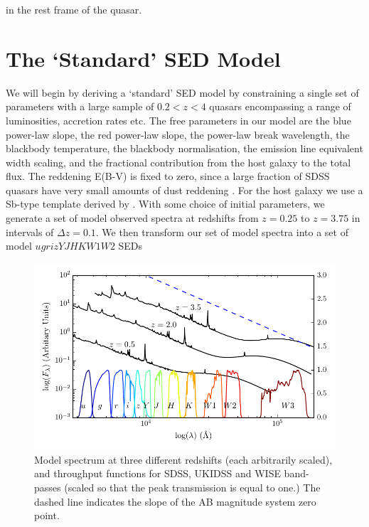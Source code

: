 in the rest frame of the quasar. 

\section{The `Standard' SED Model} 

We will begin by deriving a `standard' SED model by constraining a single set of parameters with a large sample of $0.2 < z < 4$ quasars encompassing a range of luminosities, accretion rates etc. 
The free parameters in our model are the blue power-law slope, the red power-law slope, the power-law break wavelength, the blackbody temperature, the blackbody normalisation, the emission line equivalent width scaling, and the fractional contribution from the host galaxy to the total flux. 
The reddening E(B-V) is fixed to zero, since a large fraction of SDSS quasars have very small amounts of dust reddening \citep{richards03}. 
For the host galaxy we use a Sb-type template derived by \citet{mannucci01}. 
With some choice of initial parameters, we generate a set of model observed spectra at redshifts from $z=0.25$ to $z=3.75$ in intervals of $\Delta z = 0.1$. 
We then transform our set of model spectra into a set of model $ugrizYJHKW1W2$ SEDs 

\begin{figure}
  \centering
  \includegraphics[width=\textwidth]{figures/chapter06/throughput.pdf}
  \caption{Model spectrum at three different redshifts (each arbitrarily scaled), and throughput functions for SDSS, UKIDSS and WISE band-passes (scaled so that the peak transmission is equal to one.) The dashed line indicates the slope of the AB magnitude system zero point.}
  \label{fig:filters}
\end{figure}

